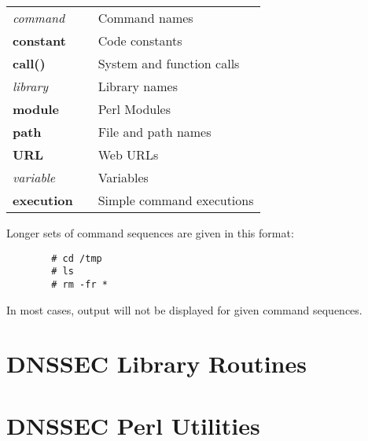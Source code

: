 \documentclass[12pt]{article}
\newcommand{\cmd}[1]{{\em #1}}
\newcommand{\const}[1]{{\bf #1}}
\newcommand{\func}[1]{{\bf #1}}
\newcommand{\lib}[1]{{\em #1}}
\newcommand{\perlmod}[1]{{\bf #1}}
\newcommand{\path}[1]{{\bf #1}}
\newcommand{\url}[1]{{\bf #1}}
\newcommand{\var}[1]{{\em #1}}
\newcommand{\xqt}[1]{{\bf #1}}
\begin{document}
\begin{table}[hb]
\begin{tabular}{lll}
\cmd{command}		& & Command names\\
\const{constant}	& & Code constants\\
\func{call()}		& & System and function calls\\
\lib{library}		& & Library names\\
\perlmod{module}	& & Perl Modules\\
\path{path}		& & File and path names\\
\url{URL}		& & Web URLs\\
\var{variable}		& & Variables\\
\xqt{execution}		& & Simple command executions\\
\end{tabular}
\end{table}

Longer sets of command sequences are given in this format:
\begin{verbatim}
        # cd /tmp
        # ls
        # rm -fr *
\end{verbatim}
In most cases, output will not be displayed for given command sequences.


\clearpage

\section{DNSSEC Library Routines}
\label{libroutines}




\clearpage

\section{DNSSEC Perl Utilities}
\label{perlutils}
\end{document}
